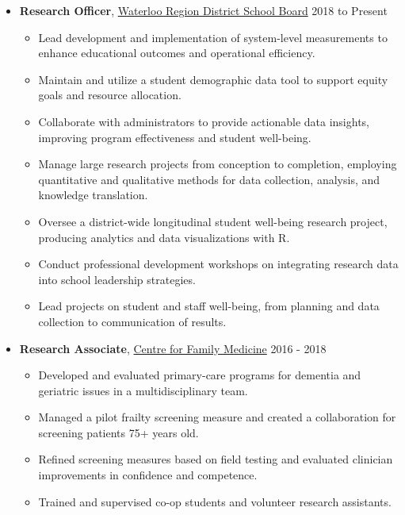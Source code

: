 \documentclass[10pt]{article}
\providecommand{\tightlist}{%
  \setlength{\itemsep}{0pt}\setlength{\parskip}{0pt}}
\begin{document}
\begin{itemize}
\item
  \textbf{Research Officer},
  \href{https://www.wrdsb.ca/about-the-wrdsb/research/}{Waterloo Region
  District School Board} \hfill  2018 to Present

  \begin{itemize}
  \tightlist
  \item
    Lead development and implementation of system-level measurements to
    enhance educational outcomes and operational efficiency.
  \item
    Maintain and utilize a student demographic data tool to support
    equity goals and resource allocation.
  \item
    Collaborate with administrators to provide actionable data insights,
    improving program effectiveness and student well-being.
  \item
    Manage large research projects from conception to completion,
    employing quantitative and qualitative methods for data collection,
    analysis, and knowledge translation.
  \item
    Oversee a district-wide longitudinal student well-being research
    project, producing analytics and data visualizations with R.
  \item
    Conduct professional development workshops on integrating research
    data into school leadership strategies.
  \item
    Lead projects on student and staff well-being, from planning and
    data collection to communication of results.
  \end{itemize}
\end{itemize}

\pagebreak[2]

\begin{itemize}
\item
  \textbf{Research Associate}, \href{https://family-medicine.ca/}{Centre
  for Family Medicine} \hfill 2016 - 2018

  \begin{itemize}
  \tightlist
  \item
    Developed and evaluated primary-care programs for dementia and
    geriatric issues in a multidisciplinary team.
  \item
    Managed a pilot frailty screening measure and created a
    collaboration for screening patients 75+ years old.
  \item
    Refined screening measures based on field testing and evaluated
    clinician improvements in confidence and competence.
  \item
    Trained and supervised co-op students and volunteer research
    assistants.
  \end{itemize}
\end{itemize}
\end{document}
